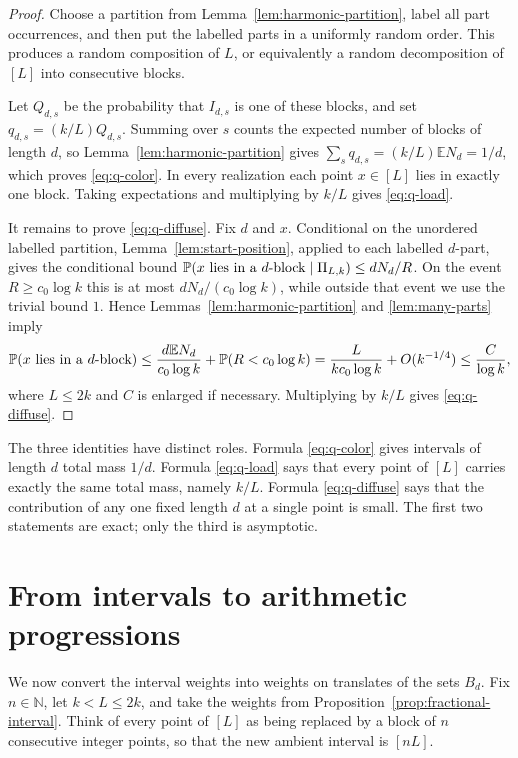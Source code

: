 \documentclass[twoside,12pt]{article}
\numberwithin{equation}{section}
\newcommand{\N}{\mathbb{N}}
\newcommand{\E}{\mathbb{E}}
\newcommand{\Prob}{\mathbb{P}}
\begin{document}
\begin{proof}
Choose a partition from Lemma~\ref{lem:harmonic-partition}, label all part
occurrences, and then put the labelled parts in a uniformly random order.  This
produces a random composition of $L$, or equivalently a random decomposition of
$[L]$ into consecutive blocks.

Let $Q_{d,s}$ be the probability that $I_{d,s}$ is one of these blocks, and set
$q_{d,s}=(k/L)Q_{d,s}$.  Summing over $s$ counts the expected number of blocks
of length $d$, so Lemma~\ref{lem:harmonic-partition} gives
$\sum_s q_{d,s}=(k/L)\E N_d=1/d$, which proves \eqref{eq:q-color}.  In every
realization each point $x\in[L]$ lies in exactly one block.  Taking
expectations and multiplying by $k/L$ gives \eqref{eq:q-load}.

It remains to prove \eqref{eq:q-diffuse}.  Fix $d$ and $x$.  Conditional on
the unordered labelled partition, Lemma~\ref{lem:start-position}, applied to
each labelled $d$-part, gives the conditional bound
$\Prob(x\hbox{ lies in a $d$-block}\mid\Pi_{L,k})\le dN_d/R$.  On the event
$R\ge c_0\log k$ this is at most $dN_d/(c_0\log k)$, while outside that event
we use the trivial bound $1$.  Hence Lemmas~\ref{lem:harmonic-partition} and
\ref{lem:many-parts} imply
\[
 \Prob(x\hbox{ lies in a $d$-block})
 \le \frac{d\E N_d}{c_0\log k}+\Prob(R<c_0\log k)
 =\frac{L}{kc_0\log k}+O(k^{-1/4})
 \le \frac{C}{\log k},
\]
where $L\le2k$ and $C$ is enlarged if necessary.  Multiplying by $k/L$ gives
\eqref{eq:q-diffuse}.
\end{proof}

The three identities have distinct roles.  Formula \eqref{eq:q-color} gives
intervals of length $d$ total mass $1/d$.  Formula \eqref{eq:q-load} says that
every point of $[L]$ carries exactly the same total mass, namely $k/L$.
Formula \eqref{eq:q-diffuse} says that the contribution of any one fixed
length $d$ at a single point is small.  The first two statements are exact;
only the third is asymptotic.

\section{From intervals to arithmetic progressions}

We now convert the interval weights into weights on translates of the sets
$B_d$.  Fix $n\in\N$, let $k<L\le2k$, and take the weights from
Proposition~\ref{prop:fractional-interval}.  Think of every point of $[L]$ as
being replaced by a block of $n$ consecutive integer points, so that the new
ambient interval is $[nL]$.
\end{document}
